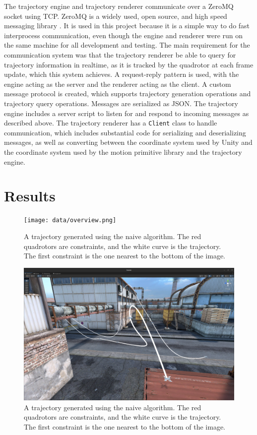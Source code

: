 \documentclass[pageno]{jpaper}
\begin{document}
The trajectory engine and trajectory renderer communicate over a ZeroMQ socket using TCP. ZeroMQ is a widely used, open source, and high speed messaging library \cite{zmq}. It is used in this project because it is a simple way to do fast interprocess communication, even though the engine and renderer were run on the same machine for all development and testing. The main requirement for the communication system was that the trajectory renderer be able to query for trajectory information in realtime, as it is tracked by the quadrotor at each frame update, which this system achieves. A request-reply pattern is used, with the engine acting as the server and the renderer acting as the client. A custom message protocol is created, which supports trajectory generation operations and trajectory query operations. Messages are serialized as JSON. The trajectory engine includes a server script to listen for and respond to incoming messages as described above. The trajectory renderer has a \texttt{Client} class to handle communication, which includes substantial code for serializing and deserializing messages, as well as converting between the coordinate system used by Unity and the coordinate system used by the motion primitive library and the trajectory engine.

\section{Results}

\begin{figure}[hbt]
  \texttt{[image: data/overview.png]}
  \caption{A trajectory generated using the naive algorithm. The red quadrotors are constraints, and the white curve is the trajectory. The first constraint is the one nearest to the bottom of the image.}
  \label{fig:overview}
\end{figure}

\begin{figure}[hbt]
  \includegraphics[width=\linewidth]{data/landing.png}
  \caption{A trajectory generated using the naive algorithm. The red quadrotors are constraints, and the white curve is the trajectory. The first constraint is the one nearest to the bottom of the image.}
  \label{fig:landing}
\end{figure}
\end{document}
